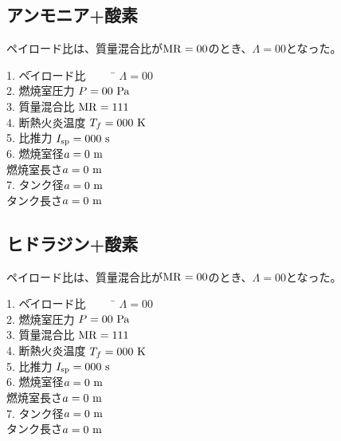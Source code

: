 \documentclass{jsarticle}
\begin{document}
\subsection{アンモニア+酸素}
ペイロード比は、質量混合比が$\rm{MR}=00$のとき、$\Lambda = 00$となった。
\begin{tabbing} 
1. \=ペイロード比 ~~~~ \= $\Lambda = 00$\\

2. \>燃焼室圧力 \> $P = 00 ~\rm{Pa}$\\

3. \>質量混合比 \>$\rm{MR}=111$\\

4. \>断熱火炎温度 \>$T_f = 000 ~ \rm{K}$\\

5. \>比推力 \>$I_{\rm{sp}}= 000 ~\rm{s}$\\

6. \>燃焼室径\>$a = 0 ~ \rm{m}$\\

\>燃焼室長さ\>$a = 0 ~ \rm{m}$\\

7. \>タンク径\>$a = 0 ~ \rm{m}$\\

\>タンク長さ\>$a = 0 ~ \rm{m}$\\
\end{tabbing} 


\subsection{ヒドラジン+酸素}
ペイロード比は、質量混合比が$\rm{MR}=00$のとき、$\Lambda = 00$となった。
\begin{tabbing} 
1. \=ペイロード比 ~~~~ \= $\Lambda = 00$\\

2. \>燃焼室圧力 \> $P = 00 ~\rm{Pa}$\\

3. \>質量混合比 \>$\rm{MR}=111$\\

4. \>断熱火炎温度 \>$T_f = 000 ~ \rm{K}$\\

5. \>比推力 \>$I_{\rm{sp}}= 000 ~\rm{s}$\\

6. \>燃焼室径\>$a = 0 ~ \rm{m}$\\

\>燃焼室長さ\>$a = 0 ~ \rm{m}$\\

7. \>タンク径\>$a = 0 ~ \rm{m}$\\

\>タンク長さ\>$a = 0 ~ \rm{m}$\\
\end{tabbing} 
\end{document}
